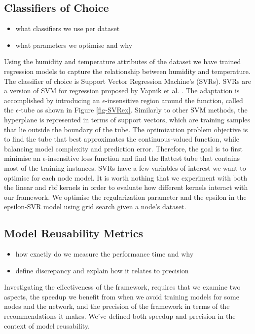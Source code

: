 \documentclass{mpaper}
\begin{document}
\subsection{Classifiers of Choice}

\begin{itemize}
    \item what classifiers we use per dataset
    \item what parameters we optimise and why
\end{itemize}

Using the humidity and temperature attributes of the dataset we have trained regression models to capture the relationship between humidity and temperature. The classifier of choice is Support Vector Regression Machine's (SVRs). SVRs are a version of SVM for regression proposed by Vapnik et al. \cite{OriginalSVR}. The adaptation is accomplished by introducing an $\epsilon$-insensitive region around the function, called the $\epsilon$-tube as shown in Figure \ref{fig-SVRex}. Similarly to other SVM methods, the hyperplane is represented in terms of support vectors, which are training samples that lie outside the boundary of the tube.  The optimization problem objective is to find the tube that best approximates the continuous-valued function, while balancing model complexity and prediction error. Therefore, the goal is to first minimise an $\epsilon$-insensitive loss function and find the flattest tube that contains most of the training instances. SVRs have a few variables of interest we want to optimise for each node model. It is worth nothing that we experiment with both the linear and rbf kernels in order to evaluate how different kernels interact with our framework. We optimise the regularization parameter and the epsilon in the epsilon-SVR model using grid search given a node's dataset.

\subsection{Model Reusability Metrics}

\begin{itemize}
    \item how exactly do we measure the performance time and why
    \item define discrepancy and explain how it relates to precision
\end{itemize}

Investigating the effectiveness of the framework, requires that we examine two aspects, the speedup we benefit from when we avoid training models for some nodes and the network, and the precision of the framework in terms of the recommendations it makes. We've defined both speedup and precision in the context of model reusability.
\end{document}
